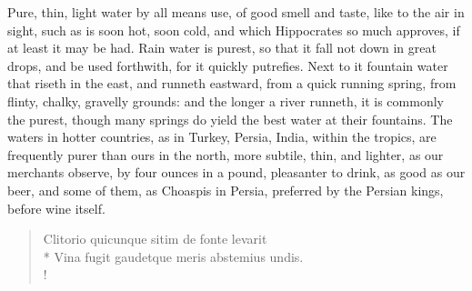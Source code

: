 {Pure, thin, light water by all means use, of good smell and taste, like to the air in sight, such as is soon hot, soon cold, and which Hippocrates so much approves, if at least it may be had. Rain water is purest, so that it fall not down in great drops, and be used forthwith, for it quickly putrefies. Next to it fountain water that riseth in the east, and runneth eastward, from a quick running spring, from flinty, chalky, gravelly grounds: and the longer a river runneth, it is commonly the purest, though many springs do yield the best water at their fountains. The waters in hotter countries, as in Turkey, Persia, India, within the tropics, are frequently purer than ours in the north, more subtile, thin, and lighter, as our merchants observe, by four ounces in a pound, pleasanter to drink, as good as our beer, and some of them, as Choaspis in Persia, preferred by the Persian kings, before wine itself.

\begin{latin}
\begin{verse}%
Clitorio quicunque sitim de fonte levarit\\*
Vina fugit gaudetque meris abstemius undis.\\!
\end{verse}%
\end{latin}

}
